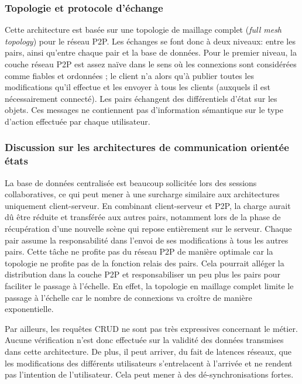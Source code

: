 \subsubsection{Topologie et protocole d'échange}
Cette architecture est basée sur une topologie de maillage complet (\textit{full 
mesh topology}) pour le réseau \gls{P2P}.
Les échanges se font donc à deux niveaux: entre les pairs, ainsi qu'entre chaque 
pair et la base de données. Pour le premier niveau, la couche réseau \gls{P2P} est 
assez 
naïve dans le sens où les connexions sont considérées comme fiables et 
ordonnées ; le client n'a alors qu'à publier toutes les modifications qu'il effectue et 
les envoyer à tous les clients (auxquels il est nécessairement connecté).
Les pairs échangent des différentiels d'état sur les objets. Ces messages ne 
contiennent pas d'information sémantique sur le type d'action effectuée par chaque 
utilisateur. 

\subsubsection{Discussion sur les architectures de 
communication orientée \og états\fg{}}

La base de données centralisée est beaucoup sollicitée lors des sessions 
collaboratives, ce qui peut mener à une surcharge similaire aux architectures 
uniquement client-serveur. 
En combinant client-serveur et \gls{P2P}, la charge aurait dû être réduite et 
transférée aux autres pairs, notamment lors de la phase de récupération d'une 
nouvelle scène qui repose entièrement sur le serveur. 
Chaque pair assume la responsabilité dans l'envoi de ses modifications à tous les 
autres pairs. Cette tâche ne profite pas du réseau \gls{P2P} de manière optimale 
car la topologie ne profite pas de la fonction relais des pairs. Cela pourrait alléger  
la distribution dans la couche \gls{P2P} et responsabiliser un peu plus les pairs 
pour faciliter le passage à l'échelle.
En effet, la topologie en maillage complet limite le passage à l'échelle car le 
nombre de connexions va croître de manière exponentielle. 

Par ailleurs, les requêtes \gls{CRUD} ne sont pas très expressives concernant le 
métier. 
Aucune vérification n'est donc effectuée sur la validité des données transmises 
dans cette architecture. De plus, il peut arriver, du fait de latences réseaux, que 
les 
modifications des différents utilisateurs s'entrelacent à l'arrivée et ne rendent pas 
l'intention de l'utilisateur. Cela peut mener à des dé-synchronisations fortes.

